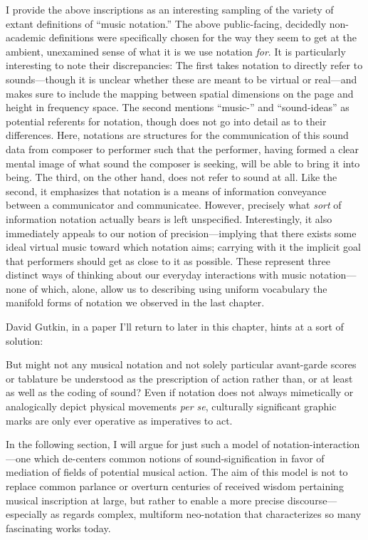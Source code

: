     I provide the above inscriptions as an interesting  sampling of the variety of extant definitions of ``music notation.'' The above public-facing, decidedly non-academic definitions were specifically chosen for the way they seem to get at the ambient, unexamined sense of what it is we use notation \textit{for}. It is particularly interesting to note their discrepancies: The first takes notation to directly refer to sounds---though it is unclear whether these are meant to be virtual or real---and makes sure to include the mapping between spatial dimensions on the page and height in frequency space. The second mentions ``music-'' and ``sound-ideas'' as potential referents for notation, though does not go into detail as to their differences. Here, notations are structures for the communication of this sound data from composer to performer such that the performer, having formed a clear mental image of what sound the composer is seeking, will be able to bring it into being. The third, on the other hand, does not refer to sound at all. Like the second, it emphasizes that notation is a means of information conveyance between a communicator and communicatee. However, precisely what \textit{sort} of information notation actually bears is left unspecified. Interestingly, it also immediately appeals to our notion of precision---implying that there exists some ideal virtual music toward which notation aims; carrying with it the implicit goal that performers should get as close to it as possible. These represent three distinct ways of thinking about our everyday interactions with music notation---none of which, alone, allow us to describing using uniform vocabulary the manifold forms of notation we observed in the last chapter.
    
    David Gutkin, in a paper I'll return to later in this chapter, hints at a sort of solution:

        \begin{smallquote}
            But might not any musical notation and not solely particular avant-garde scores or tablature be understood as the prescription of action rather than, or at least as well as the coding of sound? Even if notation does not always mimetically or analogically depict physical movements \textit{per se}, culturally significant graphic marks are only ever operative as imperatives to act.\autocite{Gutkin}
        \end{smallquote}

    In the following section, I will argue for just such a model of notation-interaction---one which de-centers common notions of sound-signification in favor of mediation of fields of potential musical action. The aim of this model is not to replace common parlance or overturn centuries of received wisdom pertaining musical inscription at large, but rather to enable a more precise discourse---especially as regards complex, multiform neo-notation that characterizes so many fascinating works today. 
    
